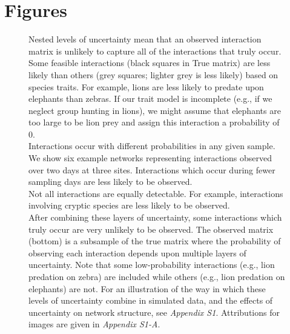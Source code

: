 \documentclass[12pt]{article}
\begin{document}

\section*{Figures}

  \begin{figure}[h!]
    \caption{Nested levels of uncertainty mean that an observed interaction matrix is unlikely to capture all of the interactions that truly occur. Some feasible interactions (black squares in True matrix) are less likely than others (grey squares; lighter grey is less likely) based on species traits. For example, lions are less likely to predate upon elephants than zebras. If our trait model is incomplete (e.g., if we neglect group hunting in lions), we might assume that elephants are too large to be lion prey and assign this interaction a probability of 0.\\
    \indent Interactions occur with different probabilities in any given sample. We show six example networks representing interactions observed over two days at three sites. Interactions which occur during fewer sampling days are less likely to be observed.\\
    \indent Not all interactions are equally detectable. For example, interactions involving cryptic species are less likely to be observed.\\
    \indent After combining these layers of uncertainty, some interactions which truly occur are very unlikely to be observed. The observed matrix (bottom) is a subsample of the true matrix where the probability of observing each interaction depends upon multiple layers of uncertainty. Note that some low-probability interactions (e.g., lion predation on zebra) are included while others (e.g., lion predation on elephants) are not. For an illustration of the way in which these levels of uncertainty combine in simulated data, and the effects of uncertainty on network structure, see \emph{Appendix S1}. Attributions for images are given in \emph{Appendix S1-A}.}
    \label{conceptual_fig}
    \begin{center}
    \end{center}
    \end{figure}
\end{document}
